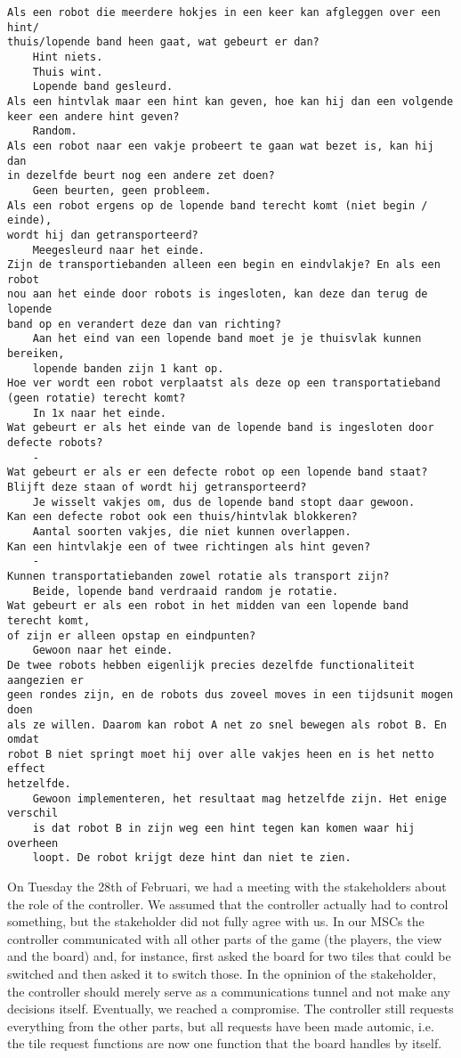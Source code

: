 \lstset{
	tabsize=5,
	basicstyle=\small,
}

\begin{lstlisting}
Als een robot die meerdere hokjes in een keer kan afgleggen over een hint/
thuis/lopende band heen gaat, wat gebeurt er dan?
	Hint niets.
	Thuis wint.
	Lopende band gesleurd.
Als een hintvlak maar een hint kan geven, hoe kan hij dan een volgende 
keer een andere hint geven?
	Random.
Als een robot naar een vakje probeert te gaan wat bezet is, kan hij dan 
in dezelfde beurt nog een andere zet doen?
	Geen beurten, geen probleem.
Als een robot ergens op de lopende band terecht komt (niet begin / einde), 
wordt hij dan getransporteerd?
	Meegesleurd naar het einde.
Zijn de transportiebanden alleen een begin en eindvlakje? En als een robot 
nou aan het einde door robots is ingesloten, kan deze dan terug de lopende 
band op en verandert deze dan van richting?
	Aan het eind van een lopende band moet je je thuisvlak kunnen bereiken, 
	lopende banden zijn 1 kant op.
Hoe ver wordt een robot verplaatst als deze op een transportatieband 
(geen rotatie) terecht komt? 
	In 1x naar het einde.
Wat gebeurt er als het einde van de lopende band is ingesloten door 
defecte robots?
	-
Wat gebeurt er als er een defecte robot op een lopende band staat? 
Blijft deze staan of wordt hij getransporteerd?
	Je wisselt vakjes om, dus de lopende band stopt daar gewoon.
Kan een defecte robot ook een thuis/hintvlak blokkeren?
	Aantal soorten vakjes, die niet kunnen overlappen.
Kan een hintvlakje een of twee richtingen als hint geven?
	-
Kunnen transportatiebanden zowel rotatie als transport zijn?
	Beide, lopende band verdraaid random je rotatie.
Wat gebeurt er als een robot in het midden van een lopende band terecht komt, 
of zijn er alleen opstap en eindpunten?
	Gewoon naar het einde.
De twee robots hebben eigenlijk precies dezelfde functionaliteit aangezien er 
geen rondes zijn, en de robots dus zoveel moves in een tijdsunit mogen doen 
als ze willen. Daarom kan robot A net zo snel bewegen als robot B. En omdat 
robot B niet springt moet hij over alle vakjes heen en is het netto effect 
hetzelfde.
	Gewoon implementeren, het resultaat mag hetzelfde zijn. Het enige verschil 
	is dat robot B in zijn weg een hint tegen kan komen waar hij overheen 
	loopt. De robot krijgt deze hint dan niet te zien.

\end{lstlisting}

On Tuesday the 28th of Februari, we had a meeting with the stakeholders about the role of the controller. We assumed that the controller actually had to control something, but the stakeholder did not fully agree with us. In our MSCs the controller communicated with all other parts of the game (the players, the view and the board) and, for instance, first asked the board for two tiles that could be switched and then asked it to switch those. In the opninion of the stakeholder, the controller should merely serve as a communications tunnel and not make any decisions itself. Eventually, we reached a compromise. The controller still requests everything from the other parts, but all requests have been made automic, i.e. the tile request functions are now one function that the board handles by itself.
